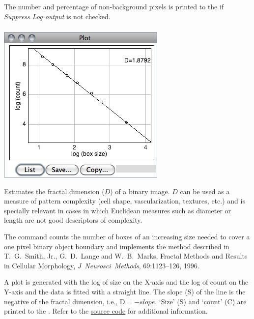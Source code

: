 The number and percentage of non-background
pixels is printed to the {\small {}} if \emph{Suppress
Log output} is not checked.




\subsubsection{\protect{} \label{sub:Fractal-Box-Count...}}

\begin{minipage}[c][1\totalheight][t]{0.44\columnwidth}%
\includegraphics[scale=0.55]{images/FractalBoxCount}%
\end{minipage}%
\begin{minipage}[c][1\totalheight][t]{0.56\columnwidth}%
Estimates the fractal dimension ($D$) of a binary image. $D$ can
be used as a measure of pattern complexity (cell shape, vascularization,
textures, etc.) and is specially relevant in cases in which Euclidean
measures such as diameter or length are not good descriptors of complexity.\medskip{}


The command counts the number of boxes of an increasing size needed
to cover a one pixel binary object boundary and implements the method
described in T.\ G.\ Smith, Jr., G.\ D.\ Lange and W.\ B.\ Marks,
Fractal Methods and Results in Cellular Morphology, \emph{J\ Neurosci\ Methods},
69:1123--126, 1996.%
\end{minipage}

A plot is generated with the log of size on the X-axis and the log
of count on the Y-axis and the data is fitted with a straight line.
The slope (S) of the line is the negative of the fractal dimension,
i.e., D$=-slope$. `Size' (S) and `count' (C) are printed to the
. Refer to the \href{http://imagej.nih.gov/ij/source/ij/plugin/filter/FractalBoxCounter.java}{source code}
for additional information.


